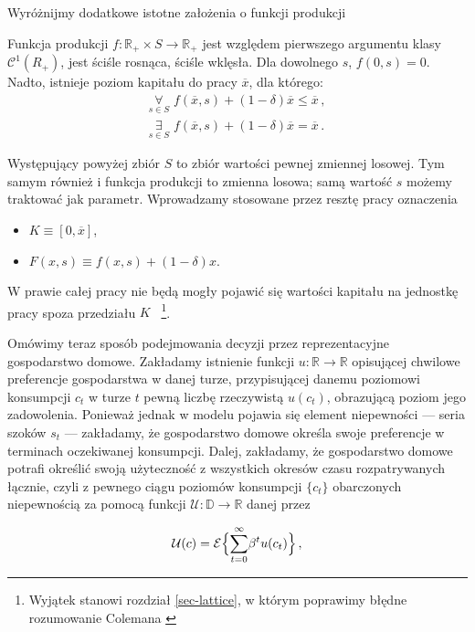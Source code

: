 Wyróżnijmy dodatkowe istotne założenia o funkcji produkcji

\begin{ass}\label{ass on prod}
Funkcja produkcji $ f: \mathbb{R}_{+} \times S \rightarrow \mathbb{R}_{+} $ jest względem pierwszego argumentu klasy $ \mathcal{C}^{1}(R_{+}) $, jest ściśle rosnąca, ściśle wklęsła. Dla dowolnego $ s $, $ f(0,s) = 0$. Nadto, istnieje poziom kapitału do pracy $ \overline{x} $, dla którego:
\begin{gather*}
	\underset{s \in S}{\forall}\,\, f(\overline{x}, s) + (1 - \delta)\overline{x} \leq \overline{x} \,,\\
	\underset{s \in S}{\exists}\,\, f(\overline{x}, s) + (1 - \delta)\overline{x} = \overline{x}\,. 
\end{gather*}
\end{ass}

Występujący powyżej zbiór $ S $ to zbiór wartości pewnej zmiennej losowej. Tym samym również i funkcja produkcji to zmienna losowa; samą wartość $ s $ możemy traktować jak parametr. Wprowadzamy stosowane przez resztę pracy oznaczenia
\begin{itemize}
	\item{$ K \equiv [0, \overline{x}]$,}
	\item{$ F(x, s) \equiv f(x,s) + (1 - \delta)x $.}
\end{itemize}

W prawie całej pracy nie będą mogły pojawić się wartości kapitału na jednostkę pracy spoza przedziału $ K $ ~\footnote{Wyjątek stanowi rozdział \ref{sec-lattice}, w którym poprawimy błędne rozumowanie Colemana \citeyear{Coleman2}}.   

Omówimy teraz sposób podejmowania decyzji przez reprezentacyjne gospodarstwo domowe. Zakładamy istnienie funkcji $ u : \mathbb{R} \rightarrow \mathbb{R} $ opisującej chwilowe preferencje gospodarstwa w danej turze, przypisującej danemu poziomowi konsumpcji $ c_t $ w turze $ t $ pewną liczbę rzeczywistą $ u(c_t) $, obrazującą poziom jego zadowolenia. Ponieważ jednak w modelu pojawia się element niepewności --- seria szoków $ s_t $ --- zakładamy, że gospodarstwo domowe określa swoje preferencje w terminach oczekiwanej konsumpcji. Dalej, zakładamy, że gospodarstwo domowe potrafi określić swoją użyteczność z wszystkich okresów czasu rozpatrywanych łącznie, czyli z pewnego ciągu poziomów konsumpcji $ \{ c_t \} $ obarczonych niepewnością za pomocą funkcji $ \mathcal{U}: \mathbb{D} \rightarrow \mathbb{R}$ danej przez

\begin{equation}\label{value_function}
\mathcal{U}(c) =  \mathcal{E} \Bigl \{ \overset{\infty}{\underset{t=0}{\sum}} \beta^t u(c_t) \Bigl \}\,,
\end{equation}

